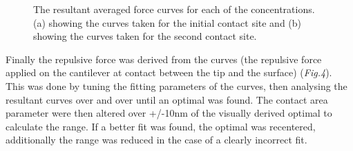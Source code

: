 \begin{figure}[!tbph]
  \centering
  \hfill
  \caption{The resultant averaged force curves for each of the concentrations. (a) showing the curves taken for the initial contact site and (b) showing the curves taken for the second contact site. }
\end{figure}

Finally the repulsive force was derived from the curves (the repulsive force applied on the cantilever at contact between the tip and the surface) (\textit{Fig.4}). This was done by tuning the fitting parameters of the curves, then analysing the resultant curves over and over until an optimal was found. The contact area parameter were then altered over +/-10nm of the visually derived optimal to calculate the range. If a better fit was found, the optimal was recentered, additionally the range was reduced in the case of a clearly incorrect fit.

